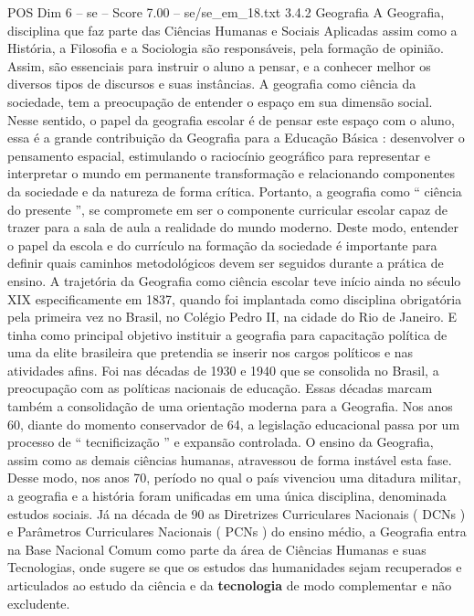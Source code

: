 \begin{textsample}{POS Dim 6 – se – Score 7.00 – se/se\_em\_18.txt}  \label{ex:f6_pos_049}
3.4.2 Geografia A Geografia, disciplina que faz parte das Ciências Humanas e Sociais Aplicadas assim como a História, a Filosofia e a Sociologia são responsáveis, pela formação de opinião.
Assim, são essenciais para instruir o aluno a pensar, e a conhecer melhor os diversos tipos de discursos e suas instâncias.
A geografia como ciência da sociedade, tem a preocupação de entender o espaço em sua dimensão social.
Nesse sentido, o papel da geografia escolar é de pensar este espaço com o aluno, essa é a grande contribuição da Geografia para a Educação Básica : desenvolver o pensamento espacial, estimulando o raciocínio geográfico para representar e interpretar o mundo em permanente transformação e relacionando componentes da sociedade e da natureza de forma crítica.
Portanto, a geografia como “ ciência do presente ”, se compromete em ser o componente curricular escolar capaz de trazer para a sala de aula a realidade do mundo moderno.
Deste modo, entender o papel da escola e do currículo na formação da sociedade é importante para definir quais caminhos metodológicos devem ser seguidos durante a prática de ensino.
A trajetória da Geografia como ciência escolar teve início ainda no século XIX especificamente em 1837, quando foi implantada como disciplina obrigatória pela primeira vez no Brasil, no Colégio Pedro II, na cidade do Rio de Janeiro.
E tinha como principal objetivo instituir a geografia para capacitação política de uma da elite brasileira que pretendia se inserir nos cargos políticos e nas atividades afins.
Foi nas décadas de 1930 e 1940 que se consolida no Brasil, a preocupação com as políticas nacionais de educação.
Essas décadas marcam também a consolidação de uma orientação moderna para a Geografia.
Nos anos 60, diante do momento conservador de 64, a legislação educacional passa por um processo de “ tecnificização ” e expansão controlada.
O ensino da Geografia, assim como as demais ciências humanas, atravessou de forma instável esta fase.
Desse modo, nos anos 70, período no qual o país vivenciou uma ditadura militar, a geografia e a história foram unificadas em uma única disciplina, denominada estudos sociais.
Já na década de 90 as Diretrizes Curriculares Nacionais ( DCNs ) e Parâmetros Curriculares Nacionais ( PCNs ) do ensino médio, a Geografia entra na Base Nacional Comum como parte da área de Ciências Humanas e suas Tecnologias, onde sugere se que os estudos das humanidades sejam recuperados e articulados ao estudo da ciência e da \textbf{tecnologia} de modo complementar e não excludente.

\end{textsample}
